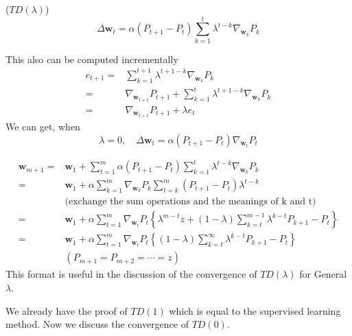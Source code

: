 \begin{defn} 
	($TD(\lambda)$) 
	\begin{equation}
		\Delta \mathbf{w}_{t} = \alpha(P_{t+1} - P_{t})
		\sum\limits^{t}_{k=1}\lambda^{t-k} \nabla_{\mathbf{w}_{k}} P_k
	\end{equation}
\end{defn}
This also can be computed incrementally
\begin{align*}
	e_{t+1} =& \sum\limits^{t+1}_{k=1} \lambda^{t+1-k} \nabla_{\mathbf{w}_{k}} P_k \\
	=& \nabla_{\mathbf{w}_{t+1}} P_{t+1} +  \sum\limits^{t}_{k=1} \lambda^{t+1-k} \nabla_{\mathbf{w}_{k}} P_k \\
	=& \nabla_{\mathbf{w}_{t+1}} P_{t+1} + \lambda e_t
\end{align*}
We can get, when 
\[ 
	\lambda = 0, \quad \Delta \mathbf{w}_{t} = \alpha(P_{t+1} - P_{t}) \nabla_{\mathbf{w}_{t}} P_t
\]

\begin{align*}
    \label{eq:4}
    \mathbf{w}_{m+1} =& \mathbf{w}_{1} + \sum^{m}_{t=1} \alpha(P_{t+1}-P_{t})
        \sum^{t}_{k=1} \lambda^{t-k} \nabla_{\mathbf{w}_{k}} P_k \\
    =&\mathbf{w}_{1} + \alpha \sum^{m}_{k=1} \nabla_{\mathbf{w}_{k}} P_k 
        \sum^{m}_{t=k} (P_{t+1} - P_{t}) \lambda^{t-k} \\
        &\text{(exchange the sum operations and the meanings of k and t)} \\
    =&\mathbf{w}_{1} + \alpha \sum^{m}_{t=1} \nabla_{\mathbf{w}_{t}} P_t
    \left\{ \lambda^{m-t} z +(1-\lambda)\sum^{m-1}_{k=t}\lambda^{k-t} P_{k+1} - P_t  \right\} \\
    =&\mathbf{w}_{1} + \alpha \sum^{m}_{t=1} \nabla_{\mathbf{w}_{t}} P_t
        \left\{ (1-\lambda)\sum^{\infty}_{k=t}\lambda^{k-t} P_{k+1} - P_t  \right\} \\
        & (P_{m+1} = P_{m+2} = \cdots = z)
\end{align*}
This format is useful in the discussion of the convergence of $TD(\lambda)$ 
for General $\lambda$.~\cite{Dayan1992}

We already have the proof of $TD(1)$ which is equal to the supervised learning method.
Now we discuss the convergence of $TD(0)$.

